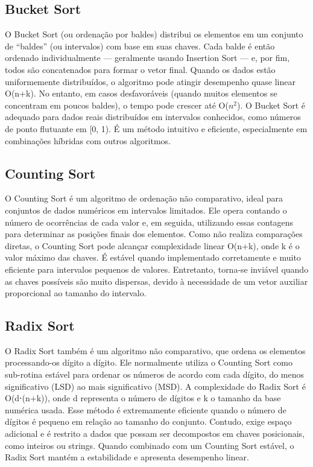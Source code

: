 \documentclass[
	article,			%
	11pt,				%
	oneside,			%
	a4paper,			%
	english,			%
	brazil,				%
	sumario=tradicional
	]{abntex2}
\begin{document}
\subsection{Bucket Sort}
O Bucket Sort (ou ordenação por baldes) distribui os elementos em um conjunto de “baldes” (ou intervalos) com base em suas chaves. Cada balde é então ordenado individualmente — geralmente usando Insertion Sort — e, por fim, todos são concatenados para formar o vetor final.
Quando os dados estão uniformemente distribuídos, o algoritmo pode atingir desempenho quase linear O(n+k). No entanto, em casos desfavoráveis (quando muitos elementos se concentram em poucos baldes), o tempo pode crescer até O($n^2$).
O Bucket Sort é adequado para dados reais distribuídos em intervalos conhecidos, como números de ponto flutuante em [0, 1). É um método intuitivo e eficiente, especialmente em combinações híbridas com outros algoritmos.


\subsection{Counting Sort}
O Counting Sort é um algoritmo de ordenação não comparativo, ideal para conjuntos de dados numéricos em intervalos limitados. Ele opera contando o número de ocorrências de cada valor e, em seguida, utilizando essas contagens para determinar as posições finais dos elementos.
Como não realiza comparações diretas, o Counting Sort pode alcançar complexidade linear O(n+k), onde k é o valor máximo das chaves.
É estável quando implementado corretamente e muito eficiente para intervalos pequenos de valores. Entretanto, torna-se inviável quando as chaves possíveis são muito dispersas, devido à necessidade de um vetor auxiliar proporcional ao tamanho do intervalo.

\subsection{Radix Sort}
O Radix Sort também é um algoritmo não comparativo, que ordena os elementos processando-os dígito a dígito. Ele normalmente utiliza o Counting Sort como sub-rotina estável para ordenar os números de acordo com cada dígito, do menos significativo (LSD) ao mais significativo (MSD).
A complexidade do Radix Sort é O(d⋅(n+k)), onde d representa o número de dígitos e k o tamanho da base numérica usada.
Esse método é extremamente eficiente quando o número de dígitos é pequeno em relação ao tamanho do conjunto. Contudo, exige espaço adicional e é restrito a dados que possam ser decompostos em chaves posicionais, como inteiros ou strings.
Quando combinado com um Counting Sort estável, o Radix Sort mantém a estabilidade e apresenta desempenho linear.
\end{document}
